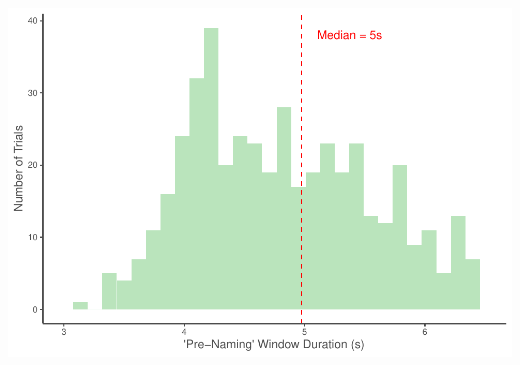 \documentclass[
  doc,floatsintext]{apa6}
\begin{document}
\includegraphics{revised_ms_analyses_files/figure-latex/r2-cn-pre-duration-1.pdf}
\end{document}
